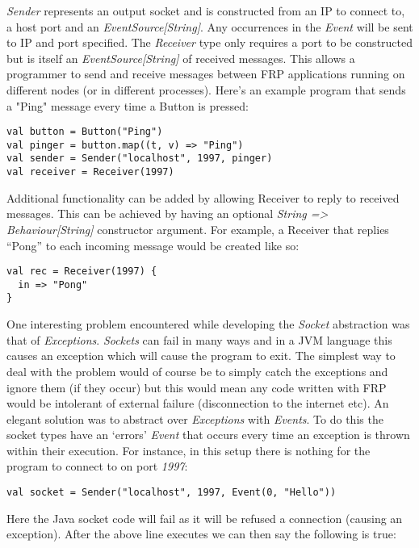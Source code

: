 \documentclass[12pt]{article}
\begin{document}
    \emph{Sender} represents an output socket and is constructed from an IP to connect to, a host port and an 
    \emph{EventSource[String]}. Any occurrences in the \emph{Event} will be sent to IP and port specified. The \emph{Receiver} 
    type only requires a port to be constructed but is itself an \emph{EventSource[String]} of received messages. This allows 
    a programmer to send and receive messages between FRP applications running on different nodes (or in different processes).
    Here's an example program that sends a "Ping" message every time a Button is pressed:

\begin{verbatim}
val button = Button("Ping")
val pinger = button.map((t, v) => "Ping")
val sender = Sender("localhost", 1997, pinger)
val receiver = Receiver(1997)
\end{verbatim}
    
    Additional functionality can be added by allowing Receiver to reply to received messages. This can be achieved by
    having an optional \emph{String => Behaviour[String]} constructor argument. For example, a Receiver that replies
    ``Pong'' to each incoming message would be created like so:
 
\begin{verbatim}
val rec = Receiver(1997) {
  in => "Pong"
}
\end{verbatim}    

    One interesting problem encountered while developing the \emph{Socket} abstraction was that of \emph{Exceptions}. 
    \emph{Sockets} can fail in many ways and in a JVM language this causes an exception which will cause the program to exit. 
    The simplest way to deal with the problem would of course be to simply catch the exceptions and ignore them (if they 
    occur) but this would mean any code written with FRP would be intolerant of external failure (disconnection to the 
    internet etc). An elegant solution was to abstract over \emph{Exceptions} with \emph{Events}. To do this the socket types 
    have an `errors' \emph{Event} that occurs every time an exception is thrown within their execution. For instance, in this 
    setup there is nothing for the program to connect to on port \emph{1997}:

\begin{verbatim}
val socket = Sender("localhost", 1997, Event(0, "Hello")) 
\end{verbatim}

    Here the Java socket code will fail as it will be refused a connection (causing an exception). After the above line 
    executes we can then say the following is true:
\end{document}
